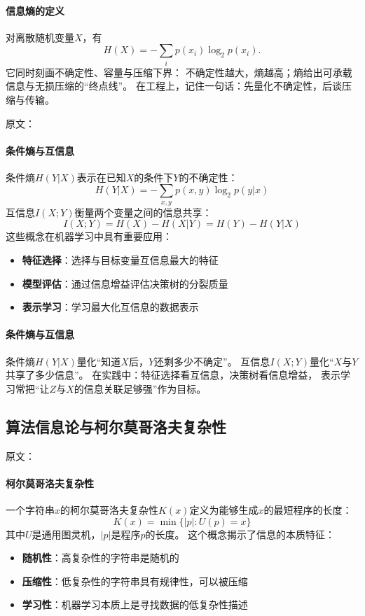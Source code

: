 \paragraph{信息熵的定义}
对离散随机变量$X$，有
$$H(X) = -\sum_{i} p(x_i)\log_2 p(x_i).$$
它同时刻画不确定性、容量与压缩下界：  
不确定性越大，熵越高；熵给出可承载信息与无损压缩的“终点线”。  
在工程上，记住一句话：先量化不确定性，后谈压缩与传输。

原文：
\paragraph{条件熵与互信息}
条件熵$H(Y|X)$表示在已知$X$的条件下$Y$的不确定性：
$$H(Y|X) = -\sum_{x,y} p(x,y) \log_2 p(y|x)$$
互信息$I(X;Y)$衡量两个变量之间的信息共享：
$$I(X;Y) = H(X) - H(X|Y) = H(Y) - H(Y|X)$$
这些概念在机器学习中具有重要应用：
\begin{itemize}
\item \textbf{特征选择}：选择与目标变量互信息最大的特征
\item \textbf{模型评估}：通过信息增益评估决策树的分裂质量
\item \textbf{表示学习}：学习最大化互信息的数据表示
\end{itemize}
\paragraph{条件熵与互信息}
条件熵$H(Y|X)$量化“知道$X$后，$Y$还剩多少不确定”。  
互信息$I(X;Y)$量化“$X$与$Y$共享了多少信息”。  
在实践中：特征选择看互信息，决策树看信息增益，  
表示学习常把“让$Z$与$X$的信息关联足够强”作为目标。

\subsection{算法信息论与柯尔莫哥洛夫复杂性}

原文：
\paragraph{柯尔莫哥洛夫复杂性}
一个字符串$x$的柯尔莫哥洛夫复杂性$K(x)$定义为能够生成$x$的最短程序的长度：
$$K(x) = \min\{|p| : U(p) = x\}$$
其中$U$是通用图灵机，$|p|$是程序$p$的长度。
这个概念揭示了信息的本质特征：
\begin{itemize}
\item \textbf{随机性}：高复杂性的字符串是随机的
\item \textbf{压缩性}：低复杂性的字符串具有规律性，可以被压缩
\item \textbf{学习性}：机器学习本质上是寻找数据的低复杂性描述
\end{itemize}
